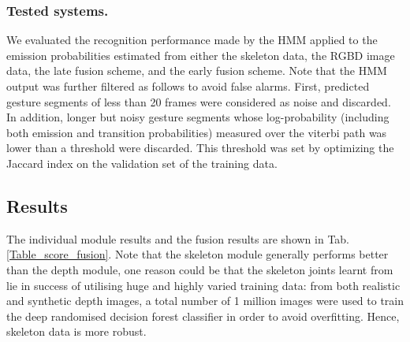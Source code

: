 \subsubsection{Tested systems.}

We evaluated the recognition performance made by the HMM applied to the emission probabilities estimated from either
the skeleton data, the RGBD image data, the late fusion scheme, and the early fusion scheme.
%
Note that the HMM output was further filtered as follows to avoid false alarms.
First, predicted gesture segments of less than 20 frames were considered as noise and discarded.
%
In addition, longer but noisy gesture segments whose log-probability (including both emission and transition probabilities)  measured over the viterbi path
was lower than a threshold were discarded.
%
This threshold was set by optimizing the Jaccard index on the validation set  of the training data.


\subsection{Results}

The individual module results and the fusion results are shown in Tab. \ref{Table_score_fusion}. Note that the skeleton module generally performs better than the depth module, one reason could be that the skeleton joints learnt from~\cite{shotton2011real} lie in success of utilising huge and highly varied training data: from both realistic and synthetic depth images, a total number of 1 million images were used to train the deep randomised decision forest classifier in order to avoid overfitting. Hence, skeleton data is more robust.

